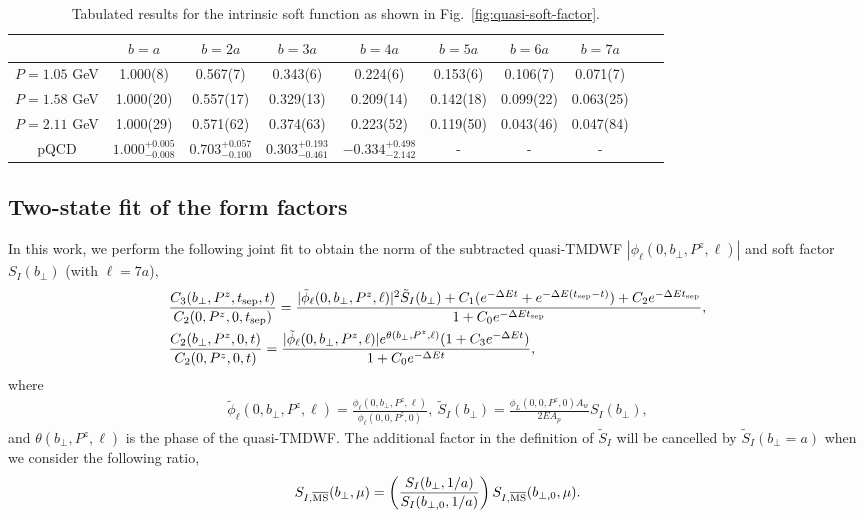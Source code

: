 \begin{table}[http]
\begin{center} 
\caption{Tabulated results for the intrinsic soft function as shown in Fig.~\ref{fig:quasi-soft-factor}. }\label{table:soft-function}
\begin{tabular}{|c|ccccccc|cc}
\hline
 & $b=a$         & $b=2a$         & $b=3a$         & $b=4a$         & $b=5a$         & $b=6a$         & $b=7a$         \\
\hline
$P=1.05$ GeV                   & 1.000(8)  & 0.567(7)  & 0.343(6)  & 0.224(6)  & 0.153(6)  & 0.106(7)  & 0.071(7)  \\
$P=1.58$ GeV     & 1.000(20) & 0.557(17) & 0.329(13) & 0.209(14) & 0.142(18) & 0.099(22) & 0.063(25) \\
$P=2.11$ GeV & 1.000(29) & 0.571(62) & 0.374(63) & 0.223(52) & 0.119(50) & 0.043(46) & 0.047(84)  \\
\hline
pQCD & $1.000_{-0.008}^{+0.005}$   &  $0.703_{-0.100}^{+0.057}$  &  $0.303_{-0.461}^{+0.193}$  & $-0.334_{-2.142}^{+0.498}$  & - & - & - \\
\hline
\end{tabular}
\end{center}
\end{table} 

\subsection{Two-state fit of the form factors}\label{subsec:twostate}


In this work, we perform the following joint fit to obtain the norm of the subtracted quasi-TMDWF $|\phi_\ell(0,b_\perp,P^z,\ell)|$ and soft factor $S_I(b_\perp)$ (with $\ell=7a$),
\begin{align}
&\frac{C_3(b_\perp,P^z,t_{\rm sep},t)}{C_2(0,P^z,0,t_{\rm sep})}=\frac{|\tilde{\phi}_\ell(0,b_\perp,P^z,\ell)|^2\tilde{S}_I(b_\perp)+C_1(e^{-\Delta E t}+e^{-\Delta E (t_{\rm sep}-t)})+C_2e^{-\Delta E t_{\rm sep}}}{1+C_0 e^{-\Delta E t_{\rm sep}}}, \nonumber\\
&\frac{C_2(b_\perp,P^z,0,t)}{C_2(0,P^z,0,t)}=\frac{|\tilde{\phi}_\ell(0,b_\perp,P^z,\ell)|e^{\theta(b_\perp,P^z,\ell)}(1+C_3e^{-\Delta E t})}{1+C_0e^{-\Delta E t}},
\label{eq:fit}
\end{align}
where
\begin{align}
\tilde{\phi}_\ell(0,b_\perp,P^z,\ell)=\frac{\phi_\ell(0,b_\perp,P^z,\ell)}{\phi_\ell(0,0,P^z,0)},\ \tilde{S}_I(b_\perp)=\frac{{\phi}_L(0,0,P^z,0)A_w}{2EA_p}S_I(b_\perp),
\end{align}
and $\theta(b_\perp,P^z,\ell)$ is the phase of the  quasi-TMDWF.
%
The additional factor in the definition of $\tilde{S}_I$ will be cancelled by $\tilde{S}_I(b_\perp=a)$ {when we consider the following ratio,
\begin{align}\label{eq:S_ratio_app}
S_{I,\overline{\rm MS}}(b_\perp,\mu)= \left(\frac{S_I(b_{\perp},1/a)}{S_I(b_{\perp,0},1/a)}\right)S_{I,\overline{\rm MS}}(b_{\perp,0},\mu).
\end{align}}

